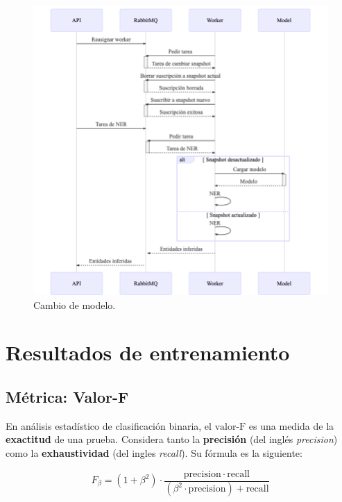 \documentclass[12pt,a4paper,]{scrartcl}
\begin{document}
\begin{figure}[H]

{\centering \includegraphics{assets/mermaid/scenarios-worker-snapshot-change.png} 

}

\caption{Cambio de modelo.}\label{fig:scenarios-worker-snapshot-change}
\end{figure}

\newpage

\hypertarget{results}{%
\section{Resultados de entrenamiento}\label{results}}

\hypertarget{muxe9trica-valor-f}{%
\subsection{Métrica: Valor-F}\label{muxe9trica-valor-f}}

En análisis estadístico de clasificación binaria, el \(\text{valor-F}\) es una medida de la \textbf{exactitud} de una prueba.
Considera tanto la \textbf{precisión} (del inglés \emph{precision}) como la \textbf{exhaustividad} (del ingles \emph{recall}). Su fórmula es la siguiente:

\[
F_\beta = (1 + \beta^2) \cdot \frac{\mathrm{precision} \cdot \mathrm{recall}}{(\beta^2 \cdot \mathrm{precision}) + \mathrm{recall}}
\]
\end{document}
